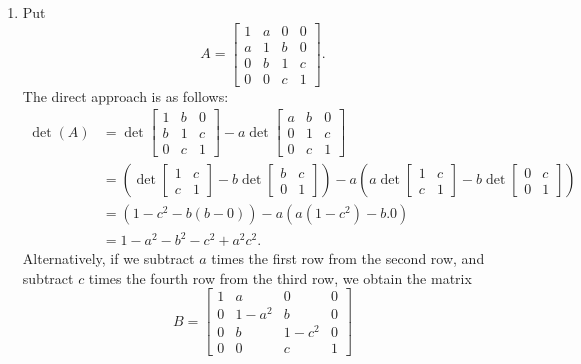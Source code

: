 \documentclass{amsart}
\renewcommand{\:}       {\colon}
\newcommand{\mks}[1]    {}
\newcommand{\mk}        {}
\begin{document}
\begin{enumerate}
 \item %
  Put
  \[ A = \left[\begin{array}{cccc}
      1 & a & 0 & 0 \\
      a & 1 & b & 0 \\
      0 & b & 1 & c \\
      0 & 0 & c & 1
     \end{array}\right].
  \]
  The direct approach is as follows:
  \begin{align*}
   \det(A) &= 
    \det\left[\begin{array}{ccc} 1&b&0 \\ b&1&c \\ 0&c&1 \end{array}\right] -
    a \det\left[\begin{array}{ccc} a&b&0 \\ 0&1&c \\ 0&c&1 \end{array}\right]
     \mks{2} \\
    &= \left(\det\left[\begin{array}{cc} 1&c\\ c&1\end{array}\right] - 
             b \det\left[\begin{array}{cc} b&c\\ 0&1\end{array}\right]\right) - 
       a\left(a \det\left[\begin{array}{cc} 1&c\\ c&1\end{array}\right] - 
              b \det\left[\begin{array}{cc} 0&c\\ 0&1\end{array}\right]\right)
     \mks{2} \\
    &= (1 - c^2 - b(b-0)) - a(a(1-c^2) - b . 0)  \mk \\
    &= 1-a^2-b^2-c^2+a^2c^2. \mk
  \end{align*}
  Alternatively, if we subtract $a$ times the first row from the second
  row, and subtract $c$ times the fourth row from the third row, we
  obtain the matrix 
  \[ B = \left[\begin{array}{cccc}
      1 & a     & 0     & 0 \\
      0 & 1-a^2 & b     & 0 \\
      0 & b     & 1-c^2 & 0 \\
      0 & 0     & c     & 1
     \end{array}\right]
\]
\end{enumerate}
\end{document}
